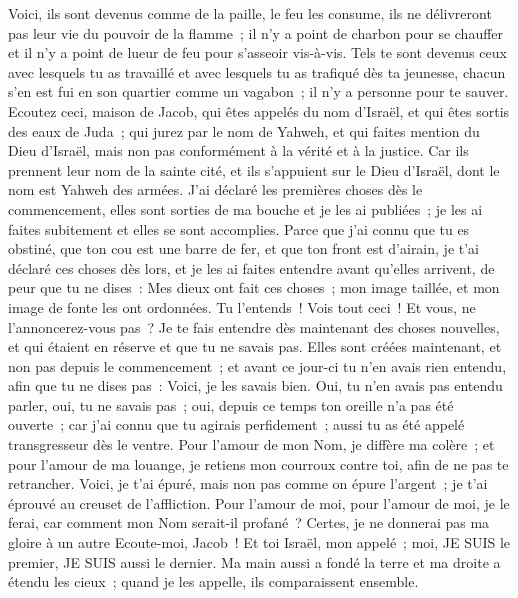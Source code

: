 \begin{multicols}{2}
Voici, ils sont devenus comme de la paille, le feu les consume, ils ne délivreront pas leur vie du pouvoir de la flamme~; il n'y a point de charbon pour se chauffer et il n'y a point de lueur de feu pour s'asseoir vis-à-vis. 
Tels te sont devenus ceux avec lesquels tu as travaillé et avec lesquels tu as trafiqué dès ta jeunesse, chacun s'en est fui en son quartier comme un vagabon~; il n'y a personne pour te sauver.
\VerseOne{}Ecoutez ceci, maison de Jacob, qui êtes appelés du nom d'Israël, et qui êtes sortis des eaux de Juda~; qui jurez par le nom de Yahweh, et qui faites mention du Dieu d'Israël, mais non pas conformément à la vérité et à la justice.
Car ils prennent leur nom de la sainte cité, et ils s'appuient sur le Dieu d'Israël, dont le nom est Yahweh des armées.
J'ai déclaré les premières choses dès le commencement, elles sont sorties de ma bouche et je les ai publiées~; je les ai faites subitement et elles se sont accomplies.
Parce que j'ai connu que tu es obstiné, que ton cou est une barre de fer, et que ton front est d'airain,
je t'ai déclaré ces choses dès lors, et je les ai faites entendre avant qu'elles arrivent, de peur que tu ne dises~: Mes dieux ont fait ces choses~; mon image taillée, et mon image de fonte les ont ordonnées.
Tu l'entends~! Vois tout ceci~! Et vous, ne l'annoncerez-vous pas~? Je te fais entendre dès maintenant des choses nouvelles, et qui étaient en réserve et que tu ne savais pas.
Elles sont créées maintenant, et non pas depuis le commencement~; et avant ce jour-ci tu n'en avais rien entendu, afin que tu ne dises pas~: Voici, je les savais bien.
Oui, tu n'en avais pas entendu parler, oui, tu ne savais pas~; oui, depuis ce temps ton oreille n'a pas été ouverte~; car j'ai connu que tu agirais perfidement~; aussi tu as été appelé transgresseur dès le ventre.
Pour l'amour de mon Nom, je diffère ma colère~; et pour l'amour de ma louange, je retiens mon courroux contre toi, afin de ne pas te retrancher.
Voici, je t'ai épuré, mais non pas comme on épure l'argent~; je t'ai éprouvé au creuset de l'affliction.
Pour l'amour de moi, pour l'amour de moi, je le ferai, car comment mon Nom serait-il profané~? Certes, je ne donnerai pas ma gloire à un autre
Ecoute-moi, Jacob~! Et toi Israël, mon appelé~; moi, JE SUIS le premier, JE SUIS aussi le dernier.
Ma main aussi a fondé la terre et ma droite a étendu les cieux~; quand je les appelle, ils comparaissent ensemble.

\end{multicols}
